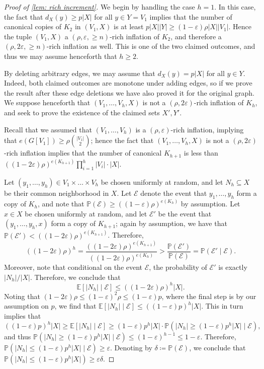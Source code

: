 \documentclass[11pt]{article}
\numberwithin{equation}{section}
\theoremstyle{plain}
\theoremstyle{remark}
\def\E{\mathbb{E}}
\def\EE{\mathcal{E}}
\newcommand{\eps}{\ensuremath{\varepsilon}}
\newcommand\ab[1]{\lvert #1 \rvert}
\renewcommand{\P}{\mathbb{P}}
\begin{document}
\begin{proof}[Proof of \cref{lem: rich increment}]


    We begin by handling the case $h=1$. In this case, the fact that $d_X(y) \geq p \ab X$ for all $y \in Y=V_1$ implies that the number of canonical copies of $K_2$ in $(V_1,X)$ is at least $p \ab X \ab Y \geq (1-\eps)\rho \ab X \ab {V_1}$. Hence the tuple $(V_1,X)$ a $(\rho,\eps,\geq n)$-rich inflation of $K_2$, and therefore a $(\rho,2\eps,\geq n)$-rich inflation as well. This is one of the two claimed outcomes, and thus we may assume henceforth that $h \geq 2$.

By deleting arbitrary edges, we may assume that $d_X(y) = p|X|$ for all $y \in Y$. Indeed, both claimed outcomes are monotone under adding edges, so if we prove the result after these edge deletions we have also proved it for the original graph. 
We suppose henceforth that $(V_1,\dots,V_h,X)$ is not a $(\rho,2\eps)$-rich inflation of $K_h$, and seek to prove the existence of the claimed sets $X',Y'$.
    
Recall that we assumed that $(V_1,\dots,V_h)$ is a $(\rho,\eps)$-rich inflation, implying that $e(G[V_1]) \geq \rho \binom{\ab{V_1}}2$; hence the fact that $(V_1,\dots,V_h,X)$ is not a $(\rho,2\eps)$-rich inflation implies that the number of canonical $K_{h+1}$ is less than $((1-2\eps)\rho)^{e(K_{h+1})} \prod_{i=1}^h \ab{V_i}\cdot \ab X$.


Let $(y_1,\dots,y_h)\in V_1\times \dots \times V_h$ be chosen uniformly at random, and let $N_h \subseteq X$ be their common neighborhood in $X$.
Let $\EE$ denote the event that $y_1,\dots,y_h$ form a copy of $K_h$, and note that $\P(\EE) \geq ((1-\eps)\rho)^{e(K_h)}$ by assumption. 
Let $x \in X$ be chosen uniformly at random, and let $\EE'$ be the event that $(y_1,\dots,y_h,x)$ form a copy of $K_{h+1}$; again by assumption, we have that $\P(\EE')<((1-2\eps)\rho)^{e(K_{h+1})}$. Therefore,
\[
((1-2\eps)\rho)^h = \frac{((1-2\eps)\rho)^{e(K_{h+1})}}{((1-2\eps)\rho)^{e(K_h)}} > \frac{\P(\EE')}{\P(\EE)} = \P(\EE' \mid \EE).
\]
Moreover, note that conditional on the event $\EE$, the probability of $\EE'$ is exactly $\ab{N_h}/\ab X$. Therefore, we conclude that
\[
\E[\ab{N_h} \mid \EE] \leq ((1-2\eps)\rho)^{h}\ab X.
\]
Noting that $(1-2\eps)\rho \leq (1-\eps)^2\rho \leq (1-\eps)p$, where the final step is by our assumption on $p$, we find that $\E[\ab{N_h} \mid \EE] \leq ((1-\eps)p)^h \ab X$. This in turn implies that
\[
((1-\eps)p)^h \ab X \geq \E[\ab{N_h} \mid \EE] \geq (1-\eps)p^h \ab X\cdot \P(\ab{N_h} \geq (1-\eps)p^h \ab X\mid \EE),
\]
and thus $\P(\ab{N_h} \geq (1-\eps)p^h \ab X \mid \EE) \leq (1-\eps)^{h-1} \leq 1-\eps$. Therefore, $\P(\ab{N_h} \leq (1-\eps)p^h \ab X \mid \EE) \geq \eps$. Denoting by $\delta \coloneqq \P(\EE)$, we conclude that
$\P(|N_h|\leq (1-\eps)p^h|X|)\ge \eps \delta$. 


\end{proof}
\end{document}
